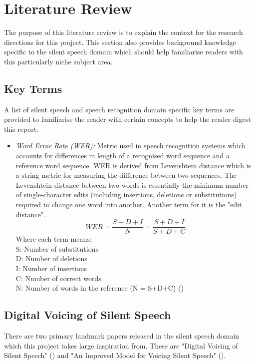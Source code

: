 \chapter{Literature Review} \label{chap:lit-review}

The purpose of this literature review is to explain the context
for the research directions for this project. This section also
provides background knowledge specific to the silent speech
domain which should help familiarise readers with this particularly
niche subject area.

\section{Key Terms}

A list of silent speech and speech recognition domain specific key terms are provided
to familiarise the reader with certain concepts to help the reader digest this report.

\begin{itemize}
\item \emph{Word Error Rate (WER):}
Metric used in speech recognition systems which accounts for differences in length of
a recognised word sequence and a reference word sequence. WER is derived from
Levenshtein distance  which is a string metric for measuring the difference between two
sequences. The Levenshtein distance between two words is essentially the minimum number of
single-character edits (including insertions, deletions or substitutions) required to
change one word into another. Another term for it is the "edit distance".
\[
  WER
  = \dfrac{S + D + I}{N}
  = \dfrac{S + D + I}{S + D + C}
\]
Where each term means:\\
S: Number of substitutions\\
D: Number of deletions\\
I: Number of insertions\\
C: Number of correct words\\
N: Number of words in the reference (N = S+D+C)
(\cite{1966SPhD...10..707L})
\end{itemize}

\section{Digital Voicing of Silent Speech}

There are two primary landmark papers released in the silent speech domain
which this project takes large inspiration from. These are
"Digital Voicing of Silent Speech" (\cite{gaddy2020digital}) and
"An Improved Model for Voicing Silent Speech" (\cite{gaddy2021improved}).

